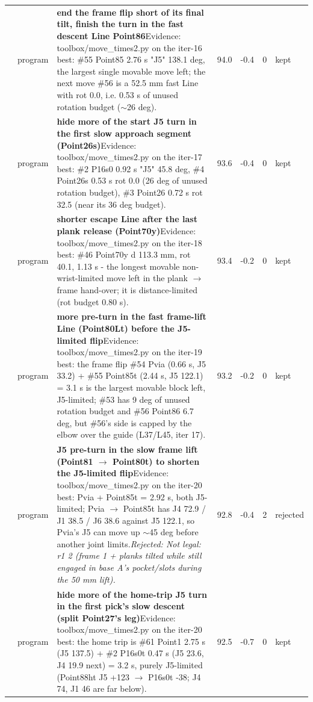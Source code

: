 {\begin{longtable}{>{\raggedleft}p{5mm} p{12mm} >{\raggedright}p{85mm} r r r p{14mm}}
17 & program & \textbf{end the frame flip short of its final tilt, finish the turn in the fast descent Line Point86}\newline Evidence: toolbox/move\_times2.py on the iter-16 best: \#55 Point85 2.76 s "J5" 138.1 deg, the largest single movable move left; the next move \#56 is a 52.5 mm fast Line with rot 0.0, i.e. 0.53 s of unused rotation budget ($\sim$26 deg). & 94.0 & -0.4 & 0 & kept \\
18 & program & \textbf{hide more of the start J5 turn in the first slow approach segment (Point26s)}\newline Evidence: toolbox/move\_times2.py on the iter-17 best: \#2 P16s0 0.92 s "J5" 45.8 deg, \#4 Point26s 0.53 s rot 0.0 (26 deg of unused rotation budget), \#3 Point26 0.72 s rot 32.5 (near its 36 deg budget). & 93.6 & -0.4 & 0 & kept \\
19 & program & \textbf{shorter escape Line after the last plank release (Point70y)}\newline Evidence: toolbox/move\_times2.py on the iter-18 best: \#46 Point70y d 113.3 mm, rot 40.1, 1.13 s - the longest movable non-wrist-limited move left in the plank $\to$ frame hand-over; it is distance-limited (rot budget 0.80 s). & 93.4 & -0.2 & 0 & kept \\
20 & program & \textbf{more pre-turn in the fast frame-lift Line (Point80Lt) before the J5-limited flip}\newline Evidence: toolbox/move\_times2.py on the iter-19 best: the frame flip \#54 Pvia (0.66 s, J5 33.2) + \#55 Point85t (2.44 s, J5 122.1) = 3.1 s is the largest movable block left, J5-limited; \#53 has 9 deg of unused rotation budget and \#56 Point86 6.7 deg, but \#56's side is capped by the elbow over the guide (L37/L45, iter 17). & 93.2 & -0.2 & 0 & kept \\
21 & program & \textbf{J5 pre-turn in the slow frame lift (Point81 $\to$ Point80t) to shorten the J5-limited flip}\newline Evidence: toolbox/move\_times2.py on the iter-20 best: Pvia + Point85t = 2.92 s, both J5-limited; Pvia $\to$ Point85t has J4 72.9 / J1 38.5 / J6 38.6 against J5 122.1, so Pvia's J5 can move up $\sim$45 deg before another joint limits.\newline \textit{Rejected: Not legal: r1 2 (frame 1 + planks tilted while still engaged in base A's pocket/slots during the 50 mm lift).} & 92.8 & -0.4 & 2 & rejected \\
22 & program & \textbf{hide more of the home-trip J5 turn in the first pick's slow descent (split Point27's leg)}\newline Evidence: toolbox/move\_times2.py on the iter-20 best: the home trip is \#61 Point1 2.75 s (J5 137.5) + \#2 P16s0t 0.47 s (J5 23.6, J4 19.9 next) = 3.2 s, purely J5-limited (Point88ht J5 +123 $\to$ P16s0t -38; J4 74, J1 46 are far below). & 92.5 & -0.7 & 0 & kept \\

\end{longtable}}
